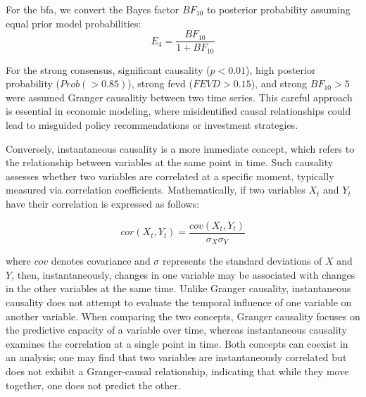 \documentclass[preprint, 3p,
authoryear]{elsarticle} %
\begin{document}
For the \gls{bfa}, we convert the Bayes factor \(BF_{10}\) to posterior
probability assuming equal prior model probabilities: \begin{equation}
E_4 = \frac{BF_{10}}{1 + BF_{10}}
\end{equation}

For the strong consensus, significant causality (\(p<0.01\)), high
posterior probability (\(Prob(>0.85)\)), strong \gls{fevd}
(\(FEVD>0.15\)), and strong \(BF_{10}>5\) were assumed Granger
causalitiy between two time series. This careful approach is essential
in economic modeling, where misidentified causal relationships could
lead to misguided policy recommendations or investment strategies.

Conversely, instantaneous causality is a more immediate concept, which
refers to the relationship between variables at the same point in time.
Such causality assesses whether two variables are correlated at a
specific moment, typically measured via correlation coefficients.
Mathematically, if two variables \(X_t\) and \(Y_t\) have their
correlation is expressed as follows:

\begin{equation}
cor(X_t, Y_t) = \frac{cov(X_t, Y_t)}{\sigma_{X} \sigma_{Y}}
\end{equation}

where \(cov\) denotes covariance and \(\sigma\) represents the standard
deviations of \(X\) and \(Y\), then, instantaneously, changes in one
variable may be associated with changes in the other variables at the
same time. Unlike Granger causality, instantaneous causality does not
attempt to evaluate the temporal influence of one variable on another
variable. When comparing the two concepts, Granger causality focuses on
the predictive capacity of a variable over time, whereas instantaneous
causality examines the correlation at a single point in time. Both
concepts can coexist in an analysis; one may find that two variables are
instantaneously correlated but does not exhibit a Granger-causal
relationship, indicating that while they move together, one does not
predict the other.
\end{document}
